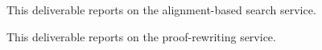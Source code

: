 \begin{workpackage}
\begin{wpdelivs}
  \begin{wpdeliv}[due=36,miles=???,id=alignsearch,dissem=PU,nature=DEM,lead=Fau]
    {This deliverable reports on the alignment-based search service.}
  \end{wpdeliv}
	
  \begin{wpdeliv}[due=36,miles=???,id=alignproofrewr,dissem=PU,nature=DEM,lead=Bol]
    {This deliverable reports on the proof-rewriting service.}
  \end{wpdeliv}

\end{wpdelivs}
\end{workpackage}

